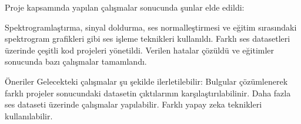 \documentclass[12pt, a4paper]{article}
\begin{document}
		Proje kapsamında yapılan çalışmalar sonucunda şunlar elde edildi:
		
		Spektrogramlaştırma, sinyal doldurma, ses normalleştirmesi ve eğitim sırasındaki spektrogram grafikleri gibi ses işleme teknikleri kullanıldı.
		Farklı ses datasetleri üzerinde çeşitli kod projeleri yönetildi.
		Verilen hatalar çözüldü ve eğitimler sonucunda bazı çalışmalar tamamlandı.
		
		Öneriler
		Gelecekteki çalışmalar şu şekilde ilerletilebilir:
		Bulgular çözümlenerek farklı projeler sonucundaki datasetin çıktılarının karşılaştırılabilinir.
		Daha fazla ses dataseti üzerinde çalışmalar yapılabilir.
		Farklı yapay zeka teknikleri kullanılabilir.
\vspace*{1\baselineskip}
\newpage


\end{document}
